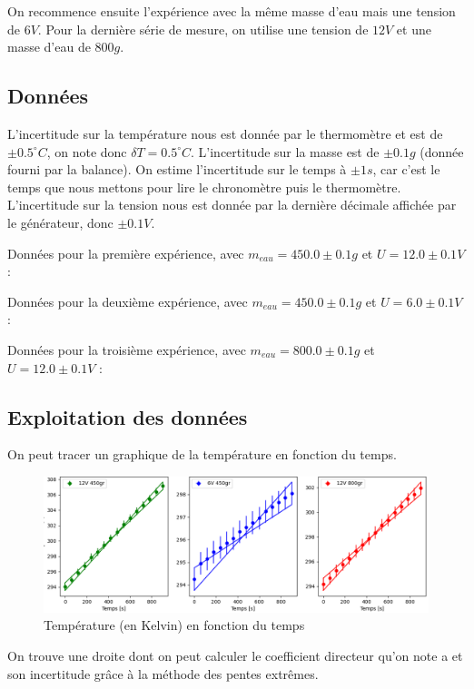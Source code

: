 \documentclass[12pt]{article}
\begin{document}
On recommence ensuite l'expérience avec la même masse d'eau mais une tension de $6V$. Pour la dernière série de mesure, on utilise une tension de $12V$ et une masse d'eau de $800g$.

\subsection{Données}

L'incertitude sur la température nous est donnée par le thermomètre et est de $\pm 0.5^\circ C$, on note donc $\delta T = 0.5^\circ C$. L'incertitude sur la masse est de $\pm 0.1g$ (donnée fourni par la balance). On estime l'incertitude sur le temps à $\pm 1s$, car c'est le temps que nous mettons pour lire le chronomètre puis le thermomètre. L'incertitude sur la tension nous est donnée par la dernière décimale affichée par le générateur, donc $\pm 0.1V$.

	Données pour la première expérience, avec $m_{eau}=450.0\pm 0.1g$ et $U=12.0\pm 0.1V$ :


	Données pour la deuxième expérience, avec $m_{eau}=450.0\pm 0.1g$ et $U=6.0\pm 0.1V$ :
	
	
	Données pour la troisième expérience, avec $m_{eau}=800.0\pm 0.1g$ et $U=12.0\pm 0.1V$ :

\newpage
\subsection{Exploitation des données}

On peut tracer un graphique de la température en fonction du temps.

\begin{figure}[h!]
	\begin{center}
		\includegraphics[scale=0.64]{img/Figure_1.png}
	\end{center}
	\label{fig:graph1}
	\caption{Température (en Kelvin) en fonction du temps}
\end{figure}

On trouve une droite dont on peut calculer le coefficient directeur qu'on note a et son incertitude grâce à la méthode des pentes extrêmes.
\end{document}
